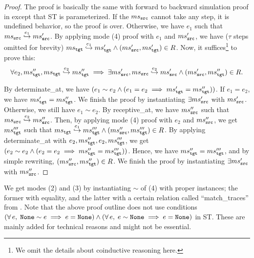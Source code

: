 \begin{proof}
The proof is basically the same with forward to backward simulation proof in \cc{} except that ST is parameterized.
If the $ms{}_{\texttt{src}{}}$ cannot take any step, it is undefined behavior, so the proof is over. Otherwise, we have $e_1$ such that $ms{}_{\texttt{src}{}} \stackrel{e_1}{\hookrightarrow} ms{}_{\texttt{src}{}}'$.
By applying mode (4) proof with $e_1$ and $ms{}_{\texttt{src}{}}'$, we have ($\tau$ steps omitted for brevity) $ms{}_{\texttt{tgt}{}} \stackrel{e_1}{\hookrightarrow} ms{}_{\texttt{tgt}{}}' \land (ms{}_{\texttt{src}{}}', ms{}_{\texttt{tgt}{}}') \in R$. Now, it suffices\footnote{We omit the details about coinductive reasoning here.} to prove this:
\[\forall e_2, ms{}_{\texttt{tgt}{}}'', ms{}_{\texttt{tgt}{}} \stackrel{e_2}{\hookrightarrow} ms{}_{\texttt{tgt}{}}'' \implies \exists ms{}_{\texttt{src}{}}', ms{}_{\texttt{src}{}} \stackrel{e_2}{\hookrightarrow} ms{}_{\texttt{src}{}}' \land (ms{}_{\texttt{src}{}}', ms{}_{\texttt{tgt}{}}'') \in R.\]

By determinate\_at, we have $(e_1 \sim e_2 \land (e_1 = e_2 \implies ms{}_{\texttt{tgt}{}}' = ms{}_{\texttt{tgt}{}}''))$.
If $e_1 = e_2$, we have $ms{}_{\texttt{tgt}{}}' = ms{}_{\texttt{tgt}{}}''$. We finish the proof by instantiating $\exists ms{}_{\texttt{src}{}}'$ with $ms{}_{\texttt{src}{}}'$.
Otherwise, we still have $e_1 \sim e_2$.
By receptive\_at, we have $ms{}_{\texttt{src}{}}''$ such that $ms{}_{\texttt{src}{}} \stackrel{e_2}{\hookrightarrow} ms{}_{\texttt{src}{}}''$.
Then, by applying mode (4) proof with $e_2$ and $ms{}_{\texttt{src}{}}''$, we get $ms{}_{\texttt{tgt}{}}'''$ such that $ms{}_{\texttt{tgt}{}} \stackrel{e_1}{\hookrightarrow} ms{}_{\texttt{tgt}{}}''' \land (ms{}_{\texttt{src}{}}'', ms{}_{\texttt{tgt}{}}''') \in R$.
By applying determinate\_at with $e_2, ms{}_{\texttt{tgt}{}}'', e_2, ms{}_{\texttt{tgt}{}}'''$, we get $(e_2 \sim e_2 \land (e_2 = e_2 \implies ms{}_{\texttt{tgt}{}}'' = ms{}_{\texttt{tgt}{}}'''))$.
Hence, we have $ms{}_{\texttt{tgt}{}}'' = ms{}_{\texttt{tgt}{}}'''$, and by simple rewriting, $(ms{}_{\texttt{src}{}}'', ms{}_{\texttt{tgt}{}}'') \in R$.
We finish the proof by instantiating $\exists ms{}_{\texttt{src}{}}'$ with $ms{}_{\texttt{src}{}}''$.

\end{proof}

We get modes (2) and (3) by instantiating $\sim$ of (4) with proper instances; the former with equality, and the latter with a certain relation called ``match\_traces'' from \cc{}.
Note that the above proof outline does not use conditions $(\forall \, e, \; \texttt{None} \sim e \implies e = \texttt{None}) \land (\forall \, e, \; e \sim \texttt{None} \implies e = \texttt{None})$ in ST.
These are mainly added for technical reasons and might not be essential.

